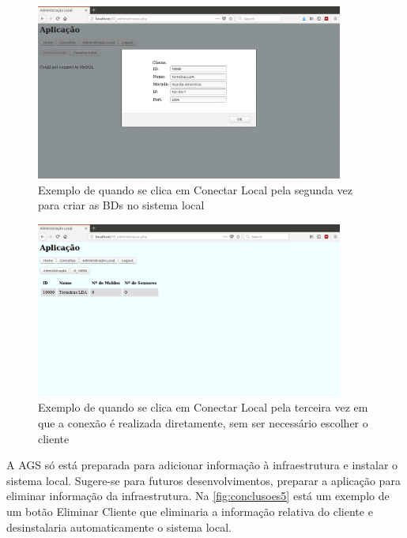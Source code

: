 \documentclass[11pt,twoside,a4paper]{report}
\begin{document}
\begin{figure}[H]
	\begin{center}
		\includegraphics[width=0.9\textwidth]{futuro04} %
		\caption[Exemplo de quando se clica em Conectar Local pela segunda vez]{Exemplo de quando se clica em Conectar Local pela segunda vez para criar as BDs no sistema local}
		\label{fig:conclusoes11}
	\end{center}
\end{figure}
\begin{figure}[H]
	\begin{center}
		\includegraphics[width=0.9\textwidth]{administracao02} %
		\caption[Exemplo de quando se clica em Conectar Local pela terceira vez]{Exemplo de quando se clica em Conectar Local pela terceira vez em que a conexão é realizada diretamente, sem ser necessário escolher o cliente}
		\label{fig:conclusoes12}
	\end{center}
\end{figure}
A AGS só está preparada para adicionar informação à infraestrutura e instalar o sistema local. Sugere-se para futuros desenvolvimentos, preparar a aplicação para eliminar informação da infraestrutura. Na \autoref{fig:conclusoes5} está um exemplo de um botão Eliminar Cliente que eliminaria a informação relativa do cliente e desinstalaria automaticamente o sistema local.
\end{document}
